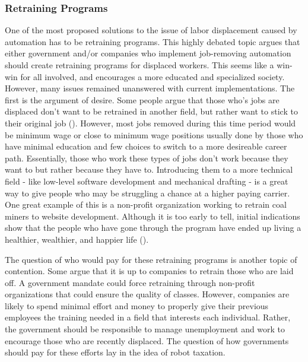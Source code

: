 \subsubsection{Retraining Programs}
One of the most proposed solutions to the issue of labor displacement caused by automation has to be retraining programs. This highly debated topic argues that either government and/or companies who implement job-removing automation should create retraining programs for displaced workers. This seems like a win-win for all involved, and encourages a more educated and specialized society. However, many issues remained unanswered with current implementations. The first is the argument of desire. Some people argue that those who's jobs are displaced don't want to be retrained in another field, but rather want to stick to their original job (\cite{miller2017beatRobots}). However, most jobs removed during this time period would be minimum wage or close to minimum wage positions usually done by those who have minimal education and few choices to switch to a more desireable career path. Essentially, those who work these types of jobs don't work because they want to but rather because they have to. Introducing them to a more technical field - like low-level software development and mechanical drafting - is a great way to give people who may be struggling a chance at a higher paying carrier. One great example of this is a non-profit organization working to retrain coal miners to website development. Although it is too early to tell, initial indications show that the people who have gone through the program have ended up living a healthier, wealthier, and happier life (\cite{phamRetrainingUnemployed}).

The question of who would pay for these retraining programs is another topic of contention. Some argue that it is up to companies to retrain those who are laid off. A government mandate could force retraining through non-profit organizations that could ensure the quality of classes. However, companies are likely to spend minimal effort and money to properly give their previous employees the training needed in a field that interests each individual. Rather, the government should be responsible to manage unemployment and work to encourage those who are recently displaced. The question of how governments should pay for these efforts lay in the idea of robot taxation. 


